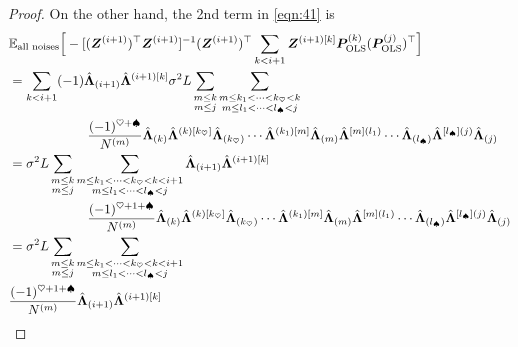 \documentclass{article}
\begin{document}
\begin{proof}
On the other hand, the 2nd term in \cref{eqn:41} is
\begin{align}
&
\E_\text{all noises}
\Big[
-
[(\bm Z^{(i+1)})^\top \bm Z^{(i+1)}]^{-1}
(\bm Z ^{(i+1)})^\top
\sum_{k<i+1}
\bm Z^{(i+1)[k]}
\bm P_\mathrm{OLS}^{(k)}
(\bm P_\mathrm{OLS}^{(j)})^\top
\Big]
\notag \\
&=
\sum_{k<i+1}
(-1)
\hat{\bm \Lambda}_{(i+1)}
\hat{\bm \Lambda}^{(i+1)[k]}
\sigma^2 L
\sum_{
\substack{
m \leq k
\\
m \leq j
}}
\sum_{
\substack{
m\leq k_1<\cdots<k_{\heartsuit}<k
\\
m \leq l_1<\cdots<l_{\spadesuit}<j
}
}
\notag \\ & \qquad\qquad\qquad
\frac{(-1)^{\heartsuit + \spadesuit}}{N^{(m)}}
\hat{\bm \Lambda}_{(k)}
\hat{\bm \Lambda}^{(k)[k_{\heartsuit}]}
\hat{\bm \Lambda}_{(k_{\heartsuit} )}
\cdots
\hat{\bm \Lambda}^{(k_1)[m]}
\hat{\bm \Lambda}_{(m)}
\hat{\bm \Lambda}^{[m](l_1)}
\cdots
\hat{\bm \Lambda}_{(l_{\spadesuit} )}
\hat{\bm \Lambda}^{[l_{\spadesuit}](j)}
\hat{\bm \Lambda}_{(j)}
\notag \\
&=
\sigma^2 L
\sum_{
\substack{
m \leq k
\\
m \leq j
}}
\sum_{
\substack{
m\leq k_1<\cdots<k_{\heartsuit}<k<i+1
\\
m \leq l_1<\cdots<l_{\spadesuit}<j
}
}
\hat{\bm \Lambda}_{(i+1)}
\hat{\bm \Lambda}^{(i+1)[k]}
\notag \\ & \qquad\qquad\qquad
\frac{(-1)^{\heartsuit+1 + \spadesuit}}{N^{(m)}}
\hat{\bm \Lambda}_{(k)}
\hat{\bm \Lambda}^{(k)[k_{\heartsuit}]}
\hat{\bm \Lambda}_{(k_{\heartsuit} )}
\cdots
\hat{\bm \Lambda}^{(k_1)[m]}
\hat{\bm \Lambda}_{(m)}
\hat{\bm \Lambda}^{[m](l_1)}
\cdots
\hat{\bm \Lambda}_{(l_{\spadesuit} )}
\hat{\bm \Lambda}^{[l_{\spadesuit}](j)}
\hat{\bm \Lambda}_{(j)}
\notag \\
&= %
\sigma^2 L
\sum_{
\substack{
m \leq k
\\
m \leq j
}}
\sum_{
\substack{
m\leq k_1<\cdots<k_{\heartsuit}<k<i+1
\\
m \leq l_1<\cdots<l_{\spadesuit}<j
}
}
\notag \\ & 
\frac{(-1)^{\heartsuit+1 + \spadesuit}}{N^{(m)}}
\hat{\bm \Lambda}_{(i+1)}
\hat{\bm \Lambda}^{(i+1)[k]}

\end{align}
\end{proof}
\end{document}

